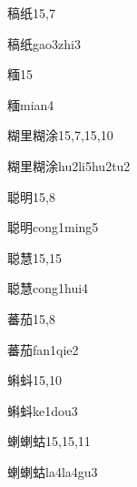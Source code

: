\begin{entry}{稿纸}{15,7}
  \begin{phonetics}{稿纸}{gao3zhi3}
  \end{phonetics}
\end{entry}

\begin{entry}{糆}{15}
  \begin{phonetics}{糆}{mian4}
  \end{phonetics}
\end{entry}

\begin{entry}{糊里糊涂}{15,7,15,10}
  \begin{phonetics}{糊里糊涂}{hu2li5hu2tu2}
  \end{phonetics}
\end{entry}

\begin{entry}{聪明}{15,8}
  \begin{phonetics}{聪明}{cong1ming5}
  \end{phonetics}
\end{entry}

\begin{entry}{聪慧}{15,15}
  \begin{phonetics}{聪慧}{cong1hui4}
  \end{phonetics}
\end{entry}

\begin{entry}{蕃茄}{15,8}
  \begin{phonetics}{蕃茄}{fan1qie2}
  \end{phonetics}
\end{entry}

\begin{entry}{蝌蚪}{15,10}
  \begin{phonetics}{蝌蚪}{ke1dou3}
  \end{phonetics}
\end{entry}

\begin{entry}{蝲蝲蛄}{15,15,11}
  \begin{phonetics}{蝲蝲蛄}{la4la4gu3}
  \end{phonetics}
\end{entry}

